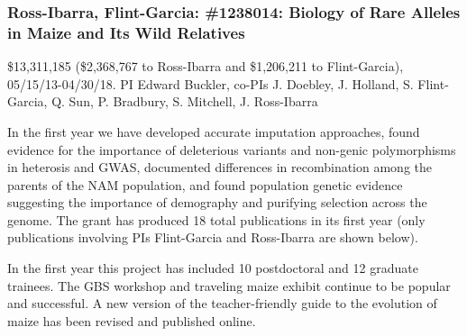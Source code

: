 
\subsubsection*{Ross-Ibarra, Flint-Garcia: \#1238014: Biology of Rare Alleles in Maize and Its Wild Relatives}
\$13,311,185 (\$2,368,767 to Ross-Ibarra and \$1,206,211 to Flint-Garcia), 05/15/13-04/30/18. PI Edward Buckler, co-PIs J. Doebley, J. Holland, S. Flint-Garcia, Q. Sun, P. Bradbury, S. Mitchell, J. Ross-Ibarra
\par{} In the first year we have developed accurate imputation approaches, found evidence for the importance of deleterious variants and non-genic polymorphisms in heterosis and GWAS, documented differences in recombination among the parents of the NAM population, and found population genetic evidence suggesting the importance of demography and purifying selection across the genome.  The grant has produced 18 total publications in its first year (only publications involving PIs Flint-Garcia and Ross-Ibarra are shown below). 
\par{}  In the first year this project has included 10 postdoctoral and 12 graduate trainees. The GBS workshop and traveling maize exhibit continue to be popular and successful. A new version of the teacher-friendly guide to the evolution of maize has been revised and published online. 
\par{} \citet{peiffer2013genetic, Romay2013, wills2013many, Mezmouk2014, Peiffer2014, sood2014mining}

